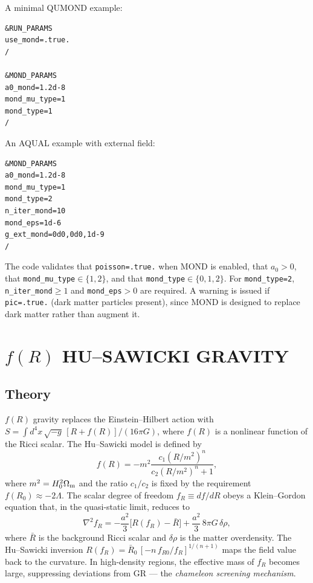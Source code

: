 \documentclass[fleqn,usenatbib]{mnras}
\newcommand{\code}[1]{\texttt{#1}}
\newcommand{\Om}{\Omega_{\rm m}}
\newcommand{\azero}{a_0}
\newcommand{\fR}{f(R)}
\newcommand{\fRz}{f_{R0}}
\begin{document}
A minimal QUMOND example:
\begin{verbatim}
&RUN_PARAMS
use_mond=.true.
/

&MOND_PARAMS
a0_mond=1.2d-8
mond_mu_type=1
mond_type=1
/
\end{verbatim}

An AQUAL example with external field:
\begin{verbatim}
&MOND_PARAMS
a0_mond=1.2d-8
mond_mu_type=1
mond_type=2
n_iter_mond=10
mond_eps=1d-6
g_ext_mond=0d0,0d0,1d-9
/
\end{verbatim}

The code validates that \code{poisson=.true.} when MOND is enabled,
that $\azero > 0$, that \code{mond\_mu\_type}$\in\{1,2\}$, and that
\code{mond\_type}$\in\{0,1,2\}$.  For \code{mond\_type=2},
\code{n\_iter\_mond}$\geq 1$ and \code{mond\_eps}${}>0$ are required.
A warning is issued if \code{pic=.true.}
(dark matter particles present), since MOND is designed to replace
dark matter rather than augment it.


\section{$f(R)$ HU--SAWICKI GRAVITY}
\label{sec:fR}

\subsection{Theory}

$\fR$ gravity \citep{Sotiriou2010} replaces the Einstein--Hilbert
action with $S = \int d^4x\,\sqrt{-g}\,[R + f(R)]/(16\pi G)$, where
$f(R)$ is a nonlinear function of the Ricci scalar.  The
Hu--Sawicki model \citep{HuSawicki2007} is defined by
\begin{equation}
f(R) = -m^2 \frac{c_1 (R/m^2)^n}{c_2(R/m^2)^n + 1},
\label{eq:fR_HS}
\end{equation}
where $m^2 = H_0^2 \Om$ and the ratio $c_1/c_2$ is fixed by the
requirement $f(R_0) \approx -2\Lambda$.  The scalar degree of freedom
$f_R \equiv df/dR$ obeys a Klein--Gordon equation that, in the
quasi-static limit, reduces to
\begin{equation}
\nabla^2 f_R = -\frac{a^2}{3}\bigl[R(f_R) - \bar{R}\bigr]
  + \frac{a^2}{3}\,8\pi G\,\delta\rho,
\label{eq:fR_eom}
\end{equation}
where $\bar{R}$ is the background Ricci scalar and $\delta\rho$ is the
matter overdensity.  The Hu--Sawicki inversion
$R(f_R) = \bar{R}_0\,[-n\,\fRz / f_R]^{1/(n+1)}$ maps the field
value back to the curvature.  In high-density regions, the effective
mass of $f_R$ becomes large, suppressing deviations from GR ---
the \emph{chameleon screening mechanism}.
\end{document}
